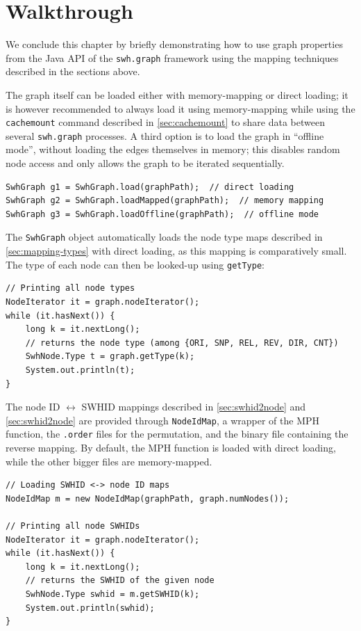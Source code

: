 \section{Walkthrough}

We conclude this chapter by briefly demonstrating how to use graph properties
from the Java API of the \texttt{swh.graph} framework using the mapping
techniques described in the sections above.

The graph itself can be loaded either with memory-mapping or direct loading; it
is however recommended to always load it using memory-mapping while using the
\texttt{cachemount} command described in \cref{sec:cachemount} to share data
between several \texttt{swh.graph} processes. A third option is to load the
graph in ``offline mode'', without loading the edges themselves in memory; this
disables random node access and only allows the graph to be iterated
sequentially.

\begin{verbatim}
SwhGraph g1 = SwhGraph.load(graphPath);  // direct loading
SwhGraph g2 = SwhGraph.loadMapped(graphPath);  // memory mapping
SwhGraph g3 = SwhGraph.loadOffline(graphPath);  // offline mode
\end{verbatim}

The \texttt{SwhGraph} object automatically loads the node type maps described
in \cref{sec:mapping-types} with direct loading, as this mapping is
comparatively small. The type of each node can then be looked-up using
\texttt{getType}:

\begin{verbatim}
// Printing all node types
NodeIterator it = graph.nodeIterator();
while (it.hasNext()) {
    long k = it.nextLong();
    // returns the node type (among {ORI, SNP, REL, REV, DIR, CNT})
    SwhNode.Type t = graph.getType(k);
    System.out.println(t);
}
\end{verbatim}

The node ID $\leftrightarrow$ \gls{SWHID} mappings described in
\cref{sec:swhid2node} and \cref{sec:swhid2node} are provided through
\texttt{NodeIdMap}, a wrapper of the \gls{MPH} function, the \texttt{.order}
files for the permutation, and the binary file containing the reverse mapping.
By default, the \gls{MPH} function is loaded with direct loading, while the
other bigger files are memory-mapped.

\begin{verbatim}
// Loading SWHID <-> node ID maps
NodeIdMap m = new NodeIdMap(graphPath, graph.numNodes());

// Printing all node SWHIDs
NodeIterator it = graph.nodeIterator();
while (it.hasNext()) {
    long k = it.nextLong();
    // returns the SWHID of the given node
    SwhNode.Type swhid = m.getSWHID(k);
    System.out.println(swhid);
}
\end{verbatim}


